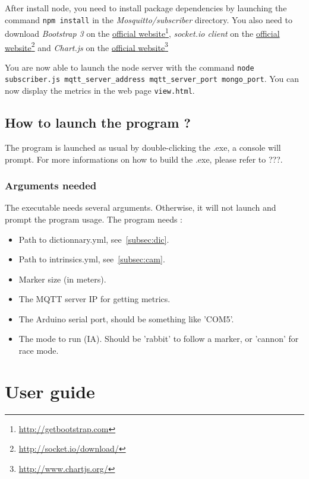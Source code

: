 \documentclass[a4paper,11pt]{report}
\begin{document}
After install node, you need to install package dependencies by launching the
command \texttt{npm install} in the \emph{Mosquitto/subscriber} directory. You
also need to download \emph{Bootstrap 3} on the
\href{http://getbootstrap.com/}{official
website}\footnote{\url{http://getbootstrap.com}}, \emph{socket.io client} on
the \href{http://socket.io/download/}{official
website}\footnote{\url{http://socket.io/download/}} and \emph{Chart.js} on the
\href{http://www.chartjs.org/}{official
website}\footnote{\url{http://www.chartjs.org/}}

You are now able to launch the node server with the command \texttt{node
subscriber.js mqtt\_server\_address mqtt\_server\_port mongo\_port}. You can
now display the metrics in the web page \texttt{view.html}.

\section{How to launch the program ?}

The program is launched as usual by double-clicking the .exe, a console will
prompt. 
For more informations on how to build the .exe, please refer to ???.

\subsection{Arguments needed}

The executable needs several arguments. Otherwise, it will not launch and
prompt the program usage.
The program needs :

\begin{itemize}
    \item Path to dictionnary.yml, see~\ref{subsec:dic}.
    \item Path to intrinsics.yml, see~\ref{subsec:cam}.
    \item Marker size (in meters).
    \item The MQTT server IP for getting metrics.
    \item The Arduino serial port, should be something like 'COM5'.
    \item The mode to run (IA). Should be 'rabbit' to follow a marker, or 'cannon' for race mode.
\end{itemize}


\chapter{User guide}
\end{document}

